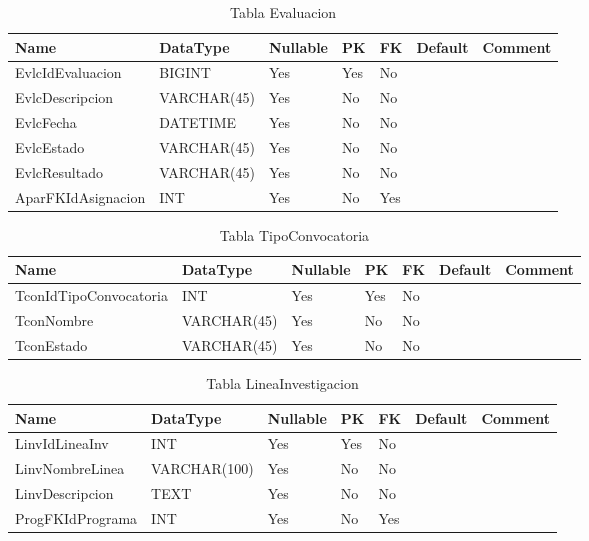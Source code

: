 \begin{table}
	\caption{Tabla Evaluacion}
	\label{labelTableEvaluacion}
	\begin{tabular}{ |l|l|l|l|l|l|l| }
		\hline
		Name & DataType & Nullable & PK & FK & Default & Comment \\ \hline
		EvlcIdEvaluacion & BIGINT & Yes & Yes & No &  & \\ \hline 
		EvlcDescripcion & VARCHAR(45) & Yes & No & No &  & \\ \hline 
		EvlcFecha & DATETIME & Yes & No & No &  & \\ \hline 
		EvlcEstado & VARCHAR(45) & Yes & No & No &  & \\ \hline 
		EvlcResultado & VARCHAR(45) & Yes & No & No &  & \\ \hline 
		AparFKIdAsignacion & INT & Yes & No & Yes &  & \\ \hline 
		
	\end{tabular}
\end{table}


\begin{table}
	\caption{Tabla TipoConvocatoria}
	\label{labelTableTipoConvocatoria}
	\begin{tabular}{ |l|l|l|l|l|l|l| }
		\hline
		Name & DataType & Nullable & PK & FK & Default & Comment \\ \hline
		TconIdTipoConvocatoria & INT & Yes & Yes & No &  & \\ \hline 
		TconNombre & VARCHAR(45) & Yes & No & No &  & \\ \hline 
		TconEstado & VARCHAR(45) & Yes & No & No &  & \\ \hline 
		
	\end{tabular}
\end{table}


\begin{table}
	\caption{Tabla LineaInvestigacion}
	\label{labelTableLineaInvestigacion}
	\begin{tabular}{ |l|l|l|l|l|l|l| }
		\hline
		Name & DataType & Nullable & PK & FK & Default & Comment \\ \hline
		LinvIdLineaInv & INT & Yes & Yes & No &  & \\ \hline 
		LinvNombreLinea & VARCHAR(100) & Yes & No & No &  & \\ \hline 
		LinvDescripcion & TEXT & Yes & No & No &  & \\ \hline 
		ProgFKIdPrograma & INT & Yes & No & Yes &  & \\ \hline 
		
	\end{tabular}
\end{table}


